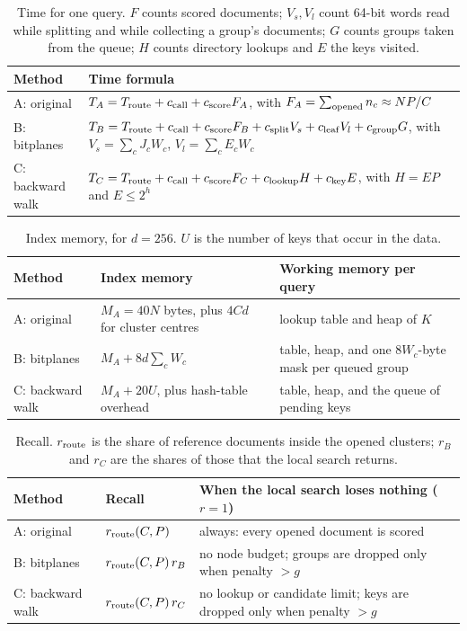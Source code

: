 \begin{table}[H]\centering\small
\caption{Time for one query. $F$ counts scored documents; $V_s,V_l$ count 64-bit words
read while splitting and while collecting a group's documents; $G$ counts groups taken from
the queue; $H$ counts directory lookups and $E$ the keys visited.}
\label{tab:time}
\begin{tabularx}{\linewidth}{@{}lY@{}}\toprule
Method & Time formula\\\midrule
A: original & $T_A=T_{\rm route}+c_{\rm call}+c_{\rm score}F_A$, with $F_A=\sum_{\rm opened}n_c\approx NP/C$\\[3pt]
B: bitplanes & $T_B=T_{\rm route}+c_{\rm call}+c_{\rm score}F_B+c_{\rm split}V_s+c_{\rm leaf}V_l+c_{\rm group}G$, with $V_s=\sum_cJ_cW_c$, $V_l=\sum_cE_cW_c$\\[3pt]
C: backward walk & $T_C=T_{\rm route}+c_{\rm call}+c_{\rm score}F_C+c_{\rm lookup}H+c_{\rm key}E$, with $H=EP$ and $E\le2^h$\\\bottomrule
\end{tabularx}
\end{table}

\begin{table}[H]\centering\small
\caption{Index memory, for $d=256$. $U$ is the number of keys that occur in the data.}
\label{tab:memory}
\begin{tabularx}{\linewidth}{@{}lYY@{}}\toprule
Method & Index memory & Working memory per query\\\midrule
A: original & $M_A=40N$ bytes, plus $4Cd$ for cluster centres & lookup table and heap of $K$\\
B: bitplanes & $M_A+8d\sum_cW_c$ & table, heap, and one $8W_c$-byte mask per queued group\\
C: backward walk & $M_A+20U$, plus hash-table overhead & table, heap, and the queue of pending keys\\\bottomrule
\end{tabularx}
\end{table}

\begin{table}[H]\centering\small
\caption{Recall. $r_{\rm route}$ is the share of reference documents inside the opened
clusters; $r_B$ and $r_C$ are the shares of those that the local search returns.}
\label{tab:recall}
\begin{tabularx}{\linewidth}{@{}lYY@{}}\toprule
Method & Recall & When the local search loses nothing ($r=1$)\\\midrule
A: original & $r_{\rm route}(C,P)$ & always: every opened document is scored\\
B: bitplanes & $r_{\rm route}(C,P)\,r_B$ & no node budget; groups are dropped only when penalty $>g$\\
C: backward walk & $r_{\rm route}(C,P)\,r_C$ & no lookup or candidate limit; keys are dropped only when penalty $>g$\\\bottomrule
\end{tabularx}
\end{table}
